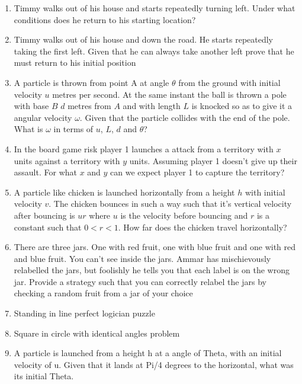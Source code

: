 \documentclass[a4paper]{article}
\begin{document}
\begin{enumerate}
\item
Timmy walks out of his house and starts repeatedly turning left. Under what conditions does he return to his starting location?

\item
Timmy walks out of his house and down the road. He starts repeatedly taking the first left. Given that he can always take another left prove that he must return to his initial position

\item
A particle is thrown from point A at angle $\theta$ from the ground with initial velocity $u$ metres per second. At the same instant the ball is thrown a pole with base $B$ $d$ metres from $A$ and with length $L$ is knocked so as to give it a angular velocity $\omega$. Given that the particle collides with the end of the pole. What is $\omega$ in terms of $u$, $L$, $d$ and $\theta$?

\item
In the board game risk player 1 launches a attack from a territory with $x$ units against a territory with $y$ units. Assuming player 1 doesn’t give up their assault. For what $x$ and $y$ can we expect player 1 to capture the territory?

\item
A particle like chicken is launched horizontally from a height $h$ with initial velocity $v$. The chicken bounces in such a way such that it’s vertical velocity after bouncing is $ur$ where $u$ is the velocity before bouncing and $r$ is a constant such that $0 < r < 1$. How far does the chicken travel horizontally?

\item
There are three jars. One with red fruit, one with blue fruit and one with red and blue fruit. You can’t see inside the jars. Ammar has mischievously relabelled the jars, but foolishly he tells you that each label is on the wrong jar. Provide a strategy such that you can correctly relabel the jars by checking a random fruit from a jar of your choice

\item
Standing in line perfect logician puzzle

\item
Square in circle with identical angles problem

\item
A particle is launched from a height h at a angle of Theta, with an initial velocity of u. Given that it lands at Pi/4 degrees to the horizontal, what was its initial Theta.


\end{enumerate}
\end{document}
